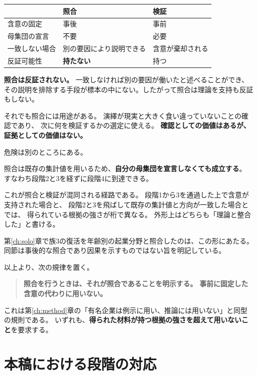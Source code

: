 \begin{center}
\begin{tabularx}{\textwidth}{@{}lXX@{}}
\toprule
 & 照合 & 検証 \\
\midrule
含意の固定 & 事後 & 事前 \\
母集団の宣言 & 不要 & 必要 \\
一致しない場合 & 別の要因により説明できる & 含意が棄却される \\
反証可能性 & \textbf{持たない} & 持つ \\
\bottomrule
\end{tabularx}
\label{tab:comparison-vs-test}
\end{center}

\textbf{照合は反証されない。} 一致しなければ別の要因が働いたと述べることができ、
その説明を排除する手段が標本の中にない。したがって照合は理論を支持も反証もしない。

それでも照合には用途がある。
演繹が現実と大きく食い違っていないことの確認であり、
次に何を検証するかの選定に使える。
\textbf{確認としての価値はあるが、証拠としての価値はない。}

危険は別のところにある。

\begin{remark}[照合は段階を飛ばせる]
\label{rem:comparison-skips-stages}
照合は既存の集計値を用いるため、\textbf{自分の母集団を宣言しなくても成立する}。
すなわち段階2と3を経ずに段階4に到達できる。

これが照合と検証が混同される経路である。
段階1から3を通過した上で含意が支持された場合と、
段階2と3を飛ばして既存の集計値と方向が一致した場合とでは、
得られている根拠の強さが桁で異なる。
外形上はどちらも「理論と整合した」と書ける。
\end{remark}

第\ref{ch:solo}章で族3の復活を年齢別の起業分野と照合したのは、この形にあたる。
同節は事後的な照合であり因果を示すものではない旨を明記している。

以上より、次の規律を置く。

\begin{quote}
\textbf{照合を行うときは、それが照合であることを明示する。
事前に固定した含意の代わりに用いない。}
\end{quote}

これは第\ref{ch:method}章の「有名企業は例示に用い、推論には用いない」と同型の規則である。
いずれも、\textbf{得られた材料が持つ根拠の強さを超えて用いないこと}を要求する。

\section{本稿における段階の対応}

